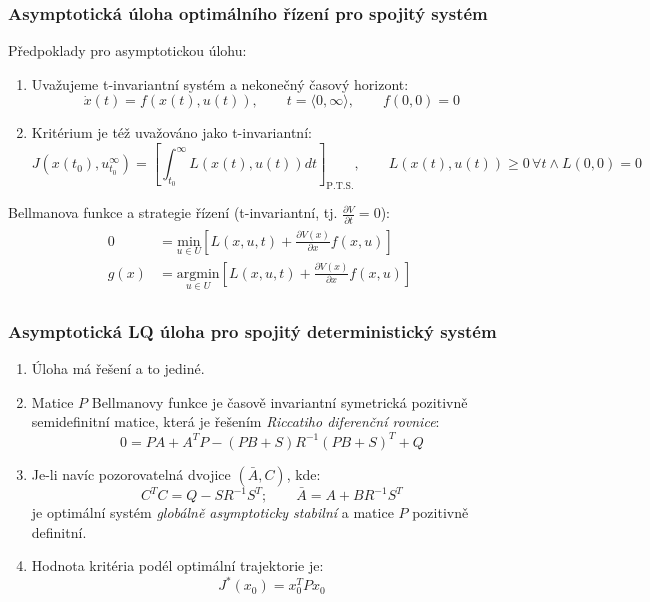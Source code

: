 \subsubsection*{Asymptotická úloha optimálního řízení pro spojitý systém}
Předpoklady pro asymptotickou úlohu:
\begin{enumerate}
\item Uvažujeme t-invariantní systém a nekonečný časový horizont:
\begin{equation*}
\dot{x}(t) = f(x(t), u(t)), \qquad t = \langle 0, \infty \rangle, \qquad f(0,0) = 0
\end{equation*}
\item Kritérium je též uvažováno jako t-invariantní:
\begin{equation*}
J(x(t_0), u_{t_0}^\infty) = \left[ \displaystyle{\int_{t_0}^\infty L(x(t),u(t)) dt} \right]_{\mathrm{P.T.S.}}, \qquad L(x(t), u(t)) \geq 0 \, \forall t \land L(0,0) = 0
\end{equation*}
\end{enumerate}
Bellmanova funkce a strategie řízení (t-invariantní, tj. $ \frac{\partial V}{\partial t} = 0 $):
\begin{align*}
\begin{split}
0 &= \underset{u \in U}{\mathrm{min}} \left[ L(x, u, t) + \frac{\partial V(x)}{\partial x} f(x,u) \right] \\
g(x) &= \underset{u \in U}{\mathrm{argmin}} \left[ L(x, u, t) + \frac{\partial V(x)}{\partial x} f(x,u) \right]
\end{split}
\end{align*}

\subsubsection*{Asymptotická LQ úloha pro spojitý deterministický systém}
\begin{enumerate}
\item Úloha má řešení a to jediné.
\item Matice $ P $ Bellmanovy funkce je časově invariantní symetrická pozitivně semidefinitní matice, která je řešením \textit{Riccatiho diferenční rovnice}:
\begin{equation}
0 = P A + A^T P - (P B + S) R^{-1} (P B + S)^T + Q
\end{equation}
\item Je-li navíc pozorovatelná dvojice $ (\bar{A}, C) $, kde:
\begin{equation*}
C^TC = Q - SR^{-1}S^T; \qquad \bar{A} = A + BR^{-1}S^T
\end{equation*}
je optimální systém \textit{globálně asymptoticky stabilní} a matice $ P $ pozitivně definitní.
\item Hodnota kritéria podél optimální trajektorie je:
\begin{equation*}
J^*(x_0) = x_0^T P x_0
\end{equation*}
\end{enumerate}


